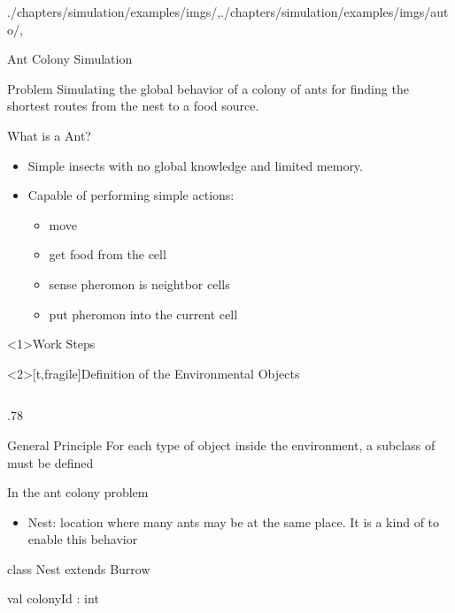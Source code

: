 \begin{graphicspathcontext}{{./chapters/simulation/examples/imgs/},{./chapters/simulation/examples/imgs/auto/},\old}

\begin{frame}[label=antexampleslide]{{Ant Colony} Simulation}
	\begin{alertblock}{Problem}
		Simulating the global behavior of a colony of ants for finding the shortest routes from the nest to a food source.
	\end{alertblock}
	\vspace{2em}
	\begin{block}{What is a Ant?}
		\begin{itemize}
		\item Simple insects with no global knowledge and limited memory.
		\item Capable of performing simple actions:
			\begin{itemize}
			\item move
			\item get food from the cell
			\item sense pheromon is neightbor cells
			\item put pheromon into the current cell
			\end{itemize}
		\end{itemize}
	\end{block}
\end{frame}

\begin{frame}<1>{Work Steps}
	\begin{center}
	\end{center}
\end{frame}

\begin{frame}<2>[t,fragile]{Definition of the Environmental Objects}
	\vspace{-.5cm}
	\smaller
	\begin{columns}
		\begin{column}[t]{.78\linewidth}
			\begin{alertblock}{General Principle}
			For each type of object inside the environment, a subclass of  must be defined
			\end{alertblock}
			\begin{block}{In the ant colony problem}
				\begin{itemize}
				\item Nest: location where many ants may be at the same place. It is a kind of  to enable this behavior
				\end{itemize}
			\end{block}
			\begin{sarllisting}[basicstyle=\scriptsize]
class Nest extends Burrow {
  val colonyId : int

}
\end{sarllisting}
\end{column}
\end{columns}
\end{frame}
\end{graphicspathcontext}
